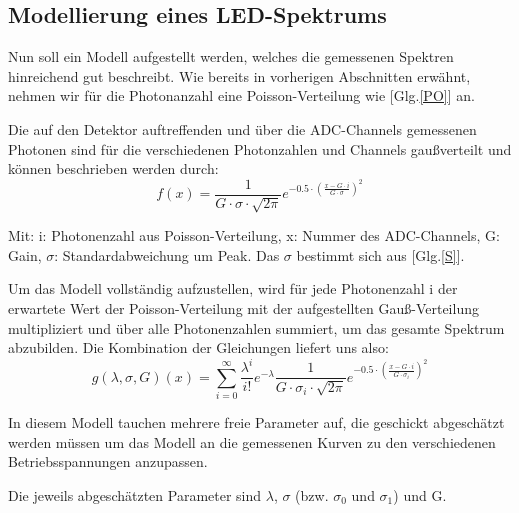 \documentclass[12pt]{article}
\begin{document}
\newpage

\subsection{Modellierung eines LED-Spektrums}
Nun soll ein Modell aufgestellt werden, welches die gemessenen Spektren hinreichend gut beschreibt.
Wie bereits in vorherigen Abschnitten erwähnt, nehmen wir für die Photonanzahl eine Poisson-Verteilung wie [Glg.\ref{PO}] an.

Die auf den Detektor auftreffenden und über die ADC-Channels gemessenen Photonen sind für die verschiedenen Photonzahlen und Channels gaußverteilt und können beschrieben werden durch:
\begin{equation}
    f(x) = \frac{1}{G\cdot \sigma \cdot \sqrt{2\pi}}e^{-0.5\cdot (\frac{x-G\cdot i}{G\cdot \sigma})^{2}}
\end{equation}

Mit: i: Photonenzahl aus Poisson-Verteilung, x: Nummer des ADC-Channels, G: Gain, $\sigma$: Standardabweichung um Peak.
Das $\sigma$ bestimmt sich aus [Glg.\ref{S}].

Um das Modell vollständig aufzustellen, wird für jede Photonenzahl i der erwartete Wert der Poisson-Verteilung mit der aufgestellten Gauß-Verteilung multipliziert und über alle Photonenzahlen summiert, um das gesamte Spektrum abzubilden.
Die Kombination der Gleichungen liefert uns also:
\begin{equation}
    g(\lambda,\sigma,G)(x) = \sum_{i=0}^{\infty}\frac{\lambda^{i}}{i!}e^{-\lambda}\frac{1}{G\cdot \sigma_{i} \cdot \sqrt{2\pi}}e^{-0.5\cdot (\frac{x-G\cdot i}{G\cdot \sigma_{i}})^{2}}\label{M}
\end{equation}

In diesem Modell tauchen mehrere freie Parameter auf, die geschickt abgeschätzt werden müssen um das Modell an die gemessenen Kurven zu den verschiedenen Betriebsspannungen anzupassen.

Die jeweils abgeschätzten Parameter sind $\lambda$, $\sigma$ (bzw. $\sigma_{0}$ und $\sigma_{1}$) und G.
\end{document}
